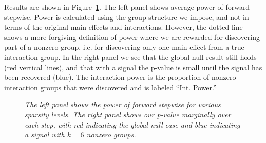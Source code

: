 \documentclass{imsart}
\begin{document}
Results are shown in Figure~\ref{fig:glint}. The left
panel shows average power of forward stepwise. Power is calculated
using the group structure we impose, and not in terms of the original
main effects and interactions. However, the dotted line shows a more
forgiving definition of power where we are rewarded for discovering part
of a nonzero group, i.e. for discovering only one main effect from a
true interaction group. In the right panel we see that the global null
result still holds (red vertical lines), and that with a signal the
p-value is small until the signal has been recovered (blue). The
interaction power is the proportion of nonzero interaction groups
that were discovered and is labeled ``Int. Power.''

\begin{figure}
\begin{center}
\hspace{-15pt}
\caption{\small \it The left panel shows the power of forward stepwise
for various sparsity levels. The right panel shows our p-value marginally
over each step, with red indicating the global null case and blue
indicating a signal with $k=6$ nonzero groups.}
\label{fig:glint}
\end{center}
\end{figure}
\end{document}
